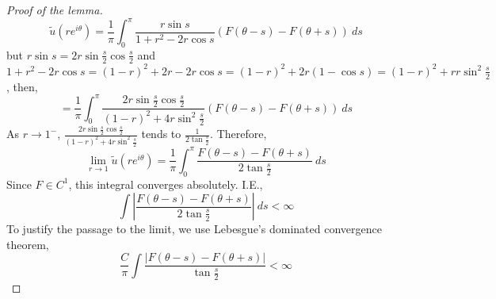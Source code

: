 \begin{proof}[Proof of the lemma]
	\[
		\tilde{u}(r e^{i \theta})
		= \frac{1}{\pi} \int_{0}^{\pi} \frac{r \sin s}{1 + r^2 - 2 r \cos s} (F(\theta - s) - F(\theta + s))\ ds
	\]
	but $r \sin s = 2 r \sin \frac{s}{2} \cos \frac{s}{2}$ and $1 + r^2 - 2 r \cos s = {(1 - r)}^2 + 2 r - 2 r \cos s = {(1 - r)}^2 + 2 r (1 - \cos s) = {(1 - r)}^2 + r r \sin^2 \frac{s}{2}$, then,
	\[
		= \frac{1}{\pi} \int_{0}^{\pi} \frac{2 r \sin \frac{s}{2} \cos \frac{s}{2}}{{(1 - r)}^2 + 4 r \sin^2 \frac{s}{2}} (F(\theta - s) - F(\theta + s))\ ds
	\]
	As $r \to 1^-$, $\frac{2 r \sin \frac{s}{2} \cos \frac{s}{2}}{{(1 - r)}^2 + 4 r \sin^2 \frac{s}{2}}$ tends to $\frac{1}{2 \tan \frac{s}{2}}$.
	Therefore,
	\[
		\lim_{r \to 1} \tilde{u}(r e^{i \theta})
		= \frac{1}{\pi} \int_{0}^{\pi} \frac{F(\theta - s) - F(\theta + s)}{2 \tan \frac{s}{2}}\ ds
	\]
	Since $F \in C^1$, this integral converges absolutely.
	I.E.,
	\[
		\int \left\lvert \frac{F(\theta - s) - F(\theta + s)}{2 \tan \frac{s}{2}} \right\rvert\ ds < \infty
	\]
	To justify the passage to the limit, we use Lebesgue's dominated convergence theorem,
	\[
		\frac{C}{\pi} \int \frac{|F(\theta - s) - F(\theta + s)|}{\tan \frac{s}{2}}
		< \infty
	\]
\end{proof}

